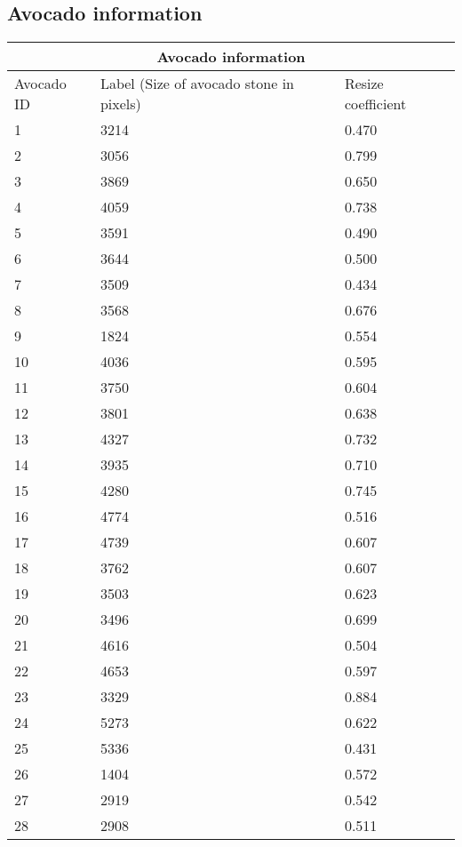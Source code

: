 \documentclass[11pt]{article}
\begin{document}
\subsection{Avocado information}

\begin{tabular}{ |p{3cm}||p{3cm}|p{3cm}|  }
 \hline
 \multicolumn{3}{|c|}{Avocado information} \\
 \hline
Avocado ID & Label (Size of avocado stone in pixels) & Resize coefficient  \\
 \hline
 1      & 3214    & 0.470     \\
 2      & 3056  & 0.799     \\
 3      & 3869     & 0.650       \\
 4      & 4059     & 0.738      \\
 5      & 3591  & 0.490       \\
 6      & 3644    & 0.500     \\
 7      & 3509  & 0.434       \\
 8      & 3568     & 0.676       \\
 9      & 1824     & 0.554       \\
 10      & 4036 & 0.595       \\
 11      & 3750   & 0.604        \\
 12      & 3801 & 0.638      \\
 13      & 4327    & 0.732       \\
 14      & 3935     & 0.710       \\
 15      & 4280 & 0.745       \\
 16      & 4774   &0.516        \\
 17      & 4739 & 0.607       \\
 18      & 3762    & 0.607       \\
 19      & 3503    & 0.623       \\
 20      & 3496 & 0.699       \\
 21      & 4616   & 0.504        \\
 22      & 4653 & 0.597       \\
 23      & 3329    & 0.884       \\
 24      & 5273    & 0.622       \\
 25      & 5336 & 0.431       \\
 26      & 1404   & 0.572        \\
 27      & 2919 & 0.542       \\
 28      & 2908    & 0.511       \\

\end{tabular}
\end{document}
